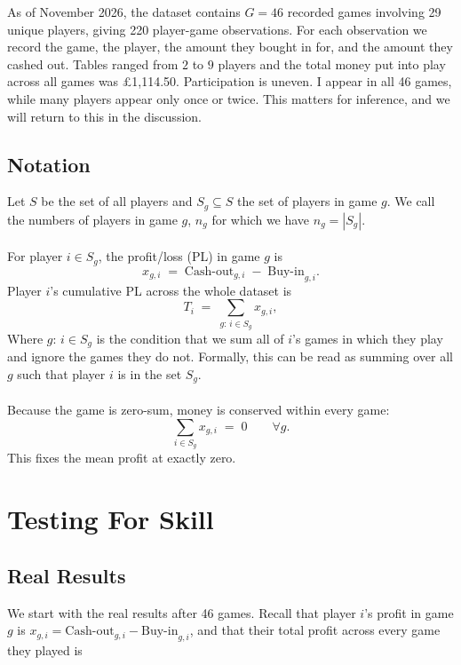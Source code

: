 \documentclass[11pt,a4paper]{article}
\begin{document}
As of November 2026, the dataset contains $G = 46$ recorded games involving 29 unique players, giving 220 player-game observations. For each observation we record the
game, the player, the amount they bought in for, and the amount they cashed out. Tables ranged from $2$ to $9$ players and the total money put into play across all games was \pounds1{,}114.50. Participation is uneven. I appear in all 46 games, while many players appear only once or twice. This matters for inference, and we will return to this in the discussion.

\subsection{Notation}

Let $S$ be the set of all players and $S_g\subseteq S$ the set of players in game $g$. We call the numbers of players in game $g$, $n_g$ for which we have $n_g = |S_g|$. \\\\
For player $i\in S_g$, the profit/loss (PL)
in game $g$ is
\begin{equation}
  x_{g,i} \;=\; \text{Cash-out}_{g,i} \;-\; \text{Buy-in}_{g,i}.
\end{equation}
Player $i$'s cumulative PL across the whole dataset is
\begin{equation}
  T_i \;=\; \sum_{g:\, i\in S_g} x_{g,i},
\end{equation}
Where $g:\, i \in S_g$ is the condition that we sum all of $i$'s games in which they play and ignore the games they do not. Formally, this can be read as summing over all $g$ such that player $i$ is in the set $S_g$.\\\\
Because the game is zero-sum, money is conserved within every game:
\begin{equation}
  \sum_{i\in S_g} x_{g,i} \;=\; 0 \qquad \forall g.
\end{equation}
This fixes the mean profit at exactly zero.

\section{Testing For Skill}

\subsection{Real Results}

We start with the real results after 46 games. Recall that player $i$'s profit in game $g$ is
$x_{g,i} = \text{Cash-out}_{g,i} - \text{Buy-in}_{g,i}$, and that their total profit across every game they played is
\end{document}
